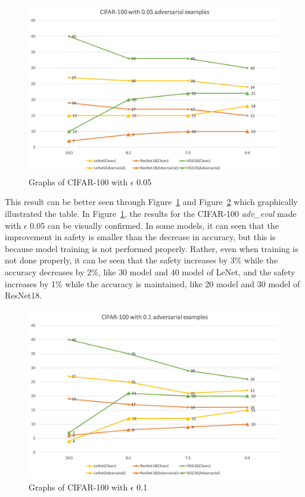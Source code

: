 \documentclass[journal,article,submit,moreauthors,pdftex]{Definitions/mdpi}
\begin{document}
\begin{figure}[H]
    \includegraphics[width=13 cm]{Definitions/graph-005cifar100.png}
    \caption{Graphs of CIFAR-100 with \begin{math}\epsilon\end{math} 0.05\label{cifar100-0.05-graph}}
\end{figure} 

This result can be better seen through Figure~\ref{cifar100-0.05-graph} and Figure~\ref{cifar100-0.1-graph} which graphically illustrated the table.
In Figure~\ref{cifar100-0.05-graph}, the results for the CIFAR-100 {\it adv\_eval} made with \begin{math}\epsilon\end{math} 0.05 can be visually confirmed.
In some models, it can seen that the improvement in safety is smaller than the decrease in accuracy, but this is because model training is not performed properly.
Rather, even when training is not done properly, it can be seen that the safety increases by 3\% while the accuracy decreases by 2\%, like 30 model and 40 model of LeNet,
and the safety increases by 1\% while the accuracy is maintained, like 20 model and 30 model of ResNet18.

\begin{figure}[H]
    \includegraphics[width=13 cm]{Definitions/graph-01cifar100.png}
    \caption{Graphs of CIFAR-100 with \begin{math}\epsilon\end{math} 0.1\label{cifar100-0.1-graph}}
\end{figure} 
\end{document}
